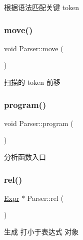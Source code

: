 根据语法匹配关键 token 

\mbox{\label{class_parser_ae6cc5bf3ee250c954a36bd16f7559d79}} 
\subsubsection{\texorpdfstring{move()}{move()}}
{\footnotesize\ttfamily void Parser\+::move (\begin{DoxyParamCaption}{ }\end{DoxyParamCaption})\hspace{0.3cm}{\ttfamily [protected]}}



扫描的 token 前移 

\mbox{\label{class_parser_af213985eb12738d0dbf7d505a8795ea2}} 
\subsubsection{\texorpdfstring{program()}{program()}}
{\footnotesize\ttfamily void Parser\+::program (\begin{DoxyParamCaption}{ }\end{DoxyParamCaption})}



分析函数入口 

\mbox{\label{class_parser_a8ca8a4997cc230fb127ddb34986e9ffd}} 
\subsubsection{\texorpdfstring{rel()}{rel()}}
{\footnotesize\ttfamily \hyperlink{class_expr}{Expr} $\ast$ Parser\+::rel (\begin{DoxyParamCaption}{ }\end{DoxyParamCaption})\hspace{0.3cm}{\ttfamily [protected]}}



生成 打小于表达式 对象 

\mbox{\label{class_parser_a3d5348cd92711fd39aea2b959e029e99}} 
